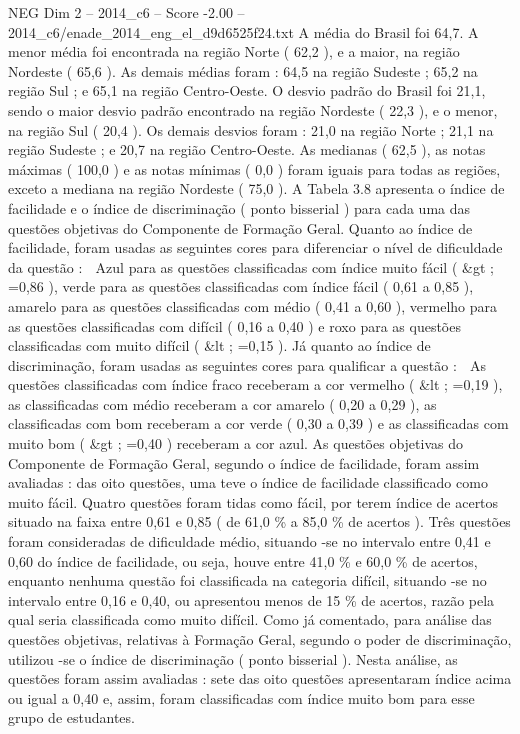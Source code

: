 \begin{textsample}{NEG Dim 2 – 2014\_c6 – Score -2.00 – 2014\_c6/enade\_2014\_eng\_el\_d9d6525f24.txt}
A média do Brasil foi 64,7.
A menor média foi encontrada na região Norte ( 62,2 ), e a maior, na região Nordeste ( 65,6 ).
As demais médias foram : 64,5 na região Sudeste ; 65,2 na região Sul ; e 65,1 na região Centro-Oeste.
O desvio padrão do Brasil foi 21,1, sendo o maior desvio padrão encontrado na região Nordeste ( 22,3 ), e o menor, na região Sul ( 20,4 ).
Os demais desvios foram : 21,0 na região Norte ; 21,1 na região Sudeste ; e 20,7 na região Centro-Oeste.
As medianas ( 62,5 ), as notas máximas ( 100,0 ) e as notas mínimas ( 0,0 ) foram iguais para todas as regiões, exceto a mediana na região Nordeste ( 75,0 ).
A Tabela 3.8 apresenta o índice de facilidade e o índice de discriminação ( ponto bisserial ) para cada uma das questões objetivas do Componente de Formação Geral.
Quanto ao índice de facilidade, foram usadas as seguintes cores para diferenciar o nível de dificuldade da questão :  Azul para as questões classificadas com índice muito fácil ( \&gt ; =0,86 ), verde para as questões classificadas com índice fácil ( 0,61 a 0,85 ), amarelo para as questões classificadas com médio ( 0,41 a 0,60 ), vermelho para as questões classificadas com difícil ( 0,16 a 0,40 ) e roxo para as questões classificadas com muito difícil ( \&lt ; =0,15 ).
Já quanto ao índice de discriminação, foram usadas as seguintes cores para qualificar a questão :  As questões classificadas com índice fraco receberam a cor vermelho ( \&lt ; =0,19 ), as classificadas com médio receberam a cor amarelo ( 0,20 a 0,29 ), as classificadas com bom receberam a cor verde ( 0,30 a 0,39 ) e as classificadas com muito bom ( \&gt ; =0,40 ) receberam a cor azul.
As questões objetivas do Componente de Formação Geral, segundo o índice de facilidade, foram assim avaliadas : das oito questões, uma teve o índice de facilidade classificado como muito fácil.
Quatro questões foram tidas como fácil, por terem índice de acertos situado na faixa entre 0,61 e 0,85 ( de 61,0 \% a 85,0 \% de acertos ).
Três questões foram consideradas de dificuldade médio, situando -se no intervalo entre 0,41 e 0,60 do índice de facilidade, ou seja, houve entre 41,0 \% e 60,0 \% de acertos, enquanto nenhuma questão foi classificada na categoria difícil, situando -se no intervalo entre 0,16 e 0,40, ou apresentou menos de 15 \% de acertos, razão pela qual seria classificada como muito difícil.
Como já comentado, para análise das questões objetivas, relativas à Formação Geral, segundo o poder de discriminação, utilizou -se o índice de discriminação ( ponto bisserial ).
Nesta análise, as questões foram assim avaliadas : sete das oito questões apresentaram índice acima ou igual a 0,40 e, assim, foram classificadas com índice muito bom para esse grupo de estudantes.

\end{textsample}
